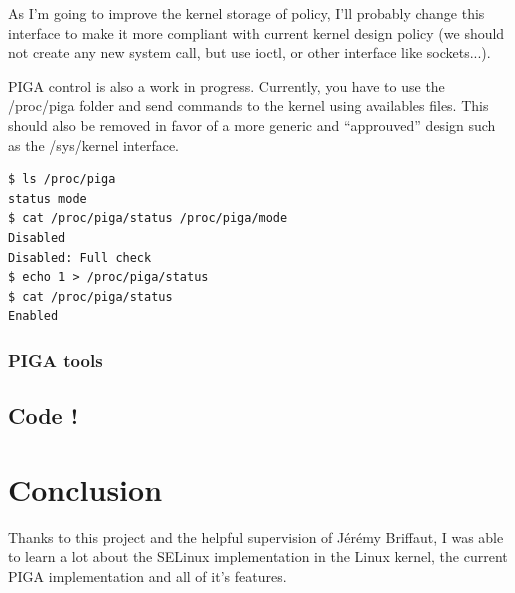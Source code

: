 \documentclass[pdftex,a4paper,titlepage,11pt]{article}
\begin{document}
As I'm going to improve the kernel storage of policy, I'll probably change this interface to make it more compliant with current kernel design policy (we should not create any new system call, but use ioctl, or other interface like sockets...).

PIGA control is also a work in progress. Currently, you have to use the /proc/piga folder and send commands to the kernel using availables files. This should also be removed in favor of a more generic and ``approuved'' design such as the /sys/kernel interface.
\begin{lstlisting}
$ ls /proc/piga
status mode
$ cat /proc/piga/status /proc/piga/mode
Disabled
Disabled: Full check
$ echo 1 > /proc/piga/status
$ cat /proc/piga/status
Enabled
\end{lstlisting}

\subsubsection{PIGA tools}


\subsection{Code !}

\newpage

\section*{Conclusion} 

Thanks to this project and the helpful supervision of Jérémy Briffaut, I was able to learn a lot about the SELinux implementation in the Linux kernel, the current PIGA implementation and all of it's features.

%
%
%
%
%
%
\end{document}

